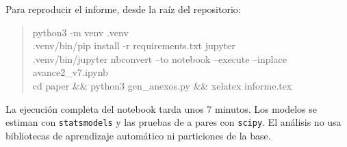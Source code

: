 \documentclass[10.5pt,a4paper,headings=small,abstract=false,bibliography=totoc,listof=totoc]{scrartcl}
\begin{document}
Para reproducir el informe, desde la raíz del repositorio:

\begin{quote}\small\ttfamily
python3 -m venv .venv\\
.venv/bin/pip install -r requirements.txt jupyter\\
.venv/bin/jupyter nbconvert --to notebook --execute --inplace avance2\_v7.ipynb\\
cd paper \&\& python3 gen\_anexos.py \&\& xelatex informe.tex
\end{quote}

La ejecución completa del notebook tarda unos 7 minutos. Los modelos se estiman con \texttt{statsmodels} y las pruebas de a pares con \texttt{scipy}. El análisis no usa bibliotecas de aprendizaje automático ni particiones de la base.
\end{document}
